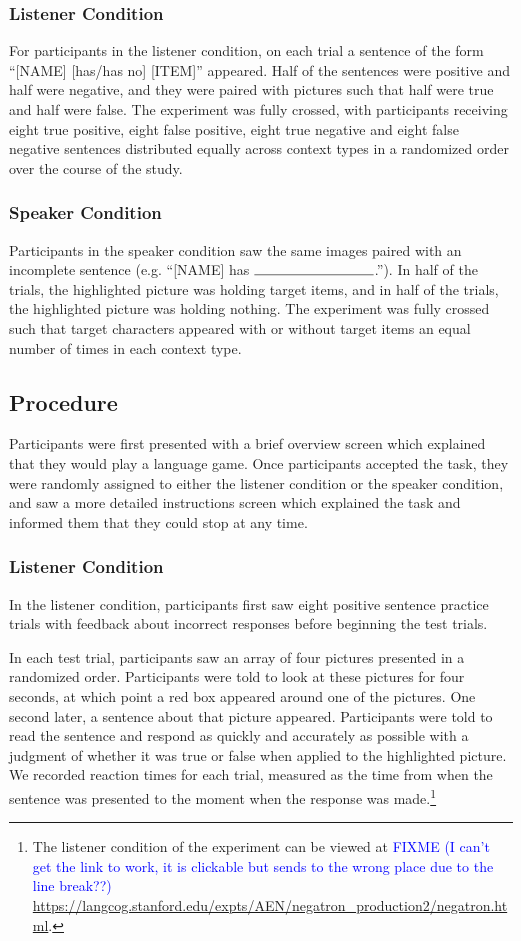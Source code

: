 \documentclass[man, noapacite]{apa2}
\begin{document}
\subsubsection{Listener Condition}
For participants in the listener condition, on each trial a sentence of the form ``[NAME] [has/has no] [ITEM]'' appeared.  Half of the sentences were positive and half were negative, and they were paired with pictures such that half were true and half were false.  The experiment was fully crossed, with participants receiving eight true positive, eight false positive, eight true negative and eight false negative sentences distributed equally across context types in a randomized order over the course of the study.  

\subsubsection{Speaker Condition}
Participants in the speaker condition saw the same images paired with an incomplete sentence (e.g. ``[NAME] has $\rule{3cm}{0.15mm}$.''). In half of the trials, the highlighted picture was holding target items, and in half of the trials, the highlighted picture was holding nothing.  The experiment was fully crossed such that target characters appeared with or without target items an equal number of times in each context type.  

\subsection{Procedure}
Participants were first presented with a brief overview screen which explained that they would play a language game.  Once participants accepted the task, they were randomly assigned to either the listener condition or the speaker condition, and saw a more detailed instructions screen which explained the task and informed them that they could stop at any time.  

\subsubsection{Listener Condition}

In the listener condition, participants first saw eight positive sentence practice trials with feedback about incorrect responses before beginning the test trials. 

In each test trial, participants saw an array of four pictures presented in a randomized order.  Participants were told to look at these pictures for four seconds, at which point a red box appeared around one of the pictures.  One second later, a sentence about that picture appeared.  Participants were told to read the sentence and respond as quickly and accurately as possible with a judgment of whether it was true or false when applied to the highlighted picture.  We recorded reaction times for each trial, measured as the time from when the sentence was presented to the moment when the response was made.\footnote{The listener condition of the experiment can be viewed at 
\textcolor{blue}{FIXME (I can't get the link to work, it is clickable but sends to the wrong place due to the line break??)} \url{https://langcog.stanford.edu/expts/AEN/negatron_production2/negatron.html}.}
\end{document}
